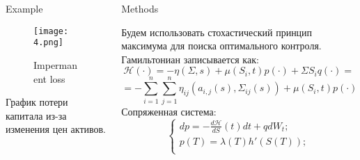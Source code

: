 \documentclass[]{beamer}
\begin{document}
\begin{frame}[t]
\begin{columns}[t]
\begin{column}{\twocolwid}
    
    \begin{columns}[t,totalwidth=\twocolwid] %
    
    \begin{column}{\onecolwid} %
    
    
    \begin{block}{Example}
    
        \begin{figure}
        \texttt{[image: 4.png]}
        \caption{Impermanent loss}
        \end{figure}
        
        График потери капитала из-за изменения цен активов.
       
        
    \end{block}


    

    
    
    \end{column} %
    
    \begin{column}{\onecolwid} %
    
    
    \begin{block}{Methods}
        
        Будем использовать стохастический принцип максимума для поиска оптимального контроля.
        Гамильтониан записывается как:
        $$ \mathcal{H}(\cdot) = -\eta(\Sigma, s) + \mu(S_i, t) p(\cdot) + \Sigma S_i q(\cdot) =  $$
        $$ = -\sum_{i = 1}^{n} \sum_{j = 1}^{n} \eta_{ij}(a_{i,j}(s), \Sigma_{ij}(s)) + \mu(S_i, t) p(\cdot) + \Sigma S_i q(\cdot),  $$
        Сопряженная система:
        $$
      \begin{cases}
        dp  = -\frac{d\mathcal{H}}{dS}(t)dt + qdW_t;\\
        p(T) = \lambda(T) h'(S(T)); \\
      \end{cases}
      $$
        

\end{block}
\end{column}
\end{columns}
\end{column}
\end{columns}
\end{frame}
\end{document}
